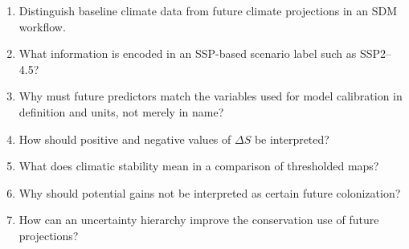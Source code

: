 \begin{enumerate}
\item Distinguish baseline climate data from future climate projections in an SDM workflow.
\item What information is encoded in an SSP-based scenario label such as SSP2--4.5?
\item Why must future predictors match the variables used for model calibration in definition and units, not merely in name?
\item How should positive and negative values of \(\Delta S\) be interpreted?
\item What does climatic stability mean in a comparison of thresholded maps?
\item Why should potential gains not be interpreted as certain future colonization?
\item How can an uncertainty hierarchy improve the conservation use of future projections?
\end{enumerate}
